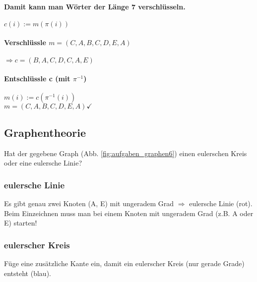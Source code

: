 \paragraph{Damit kann man Wörter der Länge 7 verschlüsseln.}
$c(i):=m(\pi(i))$\\

\paragraph{Verschlüssle $m=(C,A,B,C,D,E,A)$}
$\Rightarrow c=(B,A,C,D,C,A,E)$

\paragraph{Entschlüssle c (mit $\pi^{-1}$)}
$m(i) := c(\pi^{-1}(i))$\\
$m=(C,A,B,C,D,E,A) \checkmark$

\subsection{Graphentheorie}
Hat der gegebene Graph (Abb. \ref{fig:aufgaben_graphen6}) einen eulerschen Kreis oder eine eulersche Linie? 

\subsubsection{eulersche Linie}
Es gibt genau zwei Knoten (A, E) mit ungeradem Grad $\Rightarrow$ eulersche Linie (rot). Beim Einzeichnen muss man bei einem Knoten mit ungeradem Grad (z.B. A oder E) starten! 

\subsubsection{eulerscher Kreis}
Füge eine zusätzliche Kante ein, damit ein eulerscher Kreis (nur gerade Grade) entsteht (blau). 
